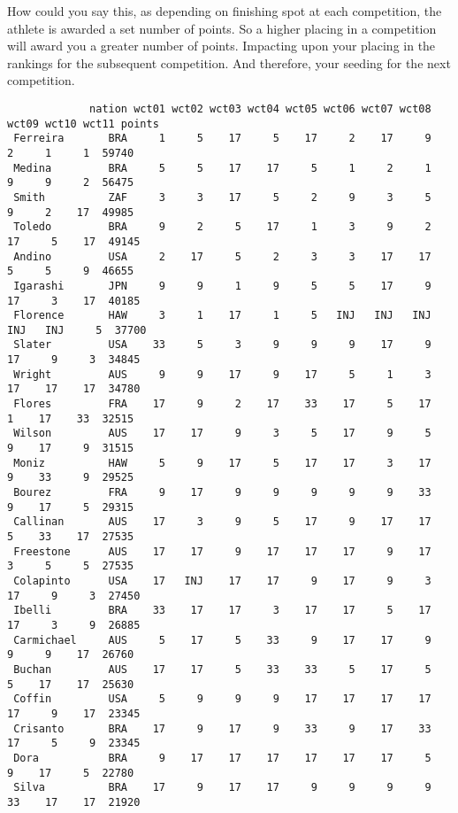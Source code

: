 \documentclass[12pt]{article}
\begin{document}
How could you say this, as depending on finishing spot at each
competition, the athlete is awarded a set number of points. So a
higher placing in a competition will award you a greater number of
points. Impacting upon your placing in the rankings for the subsequent
competition. And therefore, your seeding for the next competition.

{\footnotesize
\begin{verbatim}
             nation wct01 wct02 wct03 wct04 wct05 wct06 wct07 wct08 wct09 wct10 wct11 points
 Ferreira       BRA     1     5    17     5    17     2    17     9     2     1     1  59740
 Medina         BRA     5     5    17    17     5     1     2     1     9     9     2  56475
 Smith          ZAF     3     3    17     5     2     9     3     5     9     2    17  49985
 Toledo         BRA     9     2     5    17     1     3     9     2    17     5    17  49145
 Andino         USA     2    17     5     2     3     3    17    17     5     5     9  46655
 Igarashi       JPN     9     9     1     9     5     5    17     9    17     3    17  40185
 Florence       HAW     3     1    17     1     5   INJ   INJ   INJ   INJ   INJ     5  37700
 Slater         USA    33     5     3     9     9     9    17     9    17     9     3  34845
 Wright         AUS     9     9    17     9    17     5     1     3    17    17    17  34780
 Flores         FRA    17     9     2    17    33    17     5    17     1    17    33  32515
 Wilson         AUS    17    17     9     3     5    17     9     5     9    17     9  31515
 Moniz          HAW     5     9    17     5    17    17     3    17     9    33     9  29525
 Bourez         FRA     9    17     9     9     9     9     9    33     9    17     5  29315
 Callinan       AUS    17     3     9     5    17     9    17    17     5    33    17  27535
 Freestone      AUS    17    17     9    17    17    17     9    17     3     5     5  27535
 Colapinto      USA    17   INJ    17    17     9    17     9     3    17     9     3  27450
 Ibelli         BRA    33    17    17     3    17    17     5    17    17     3     9  26885
 Carmichael     AUS     5    17     5    33     9    17    17     9     9     9    17  26760
 Buchan         AUS    17    17     5    33    33     5    17     5     5    17    17  25630
 Coffin         USA     5     9     9     9    17    17    17    17    17     9    17  23345
 Crisanto       BRA    17     9    17     9    33     9    17    33    17     5     9  23345
 Dora           BRA     9    17    17    17    17    17    17     5     9    17     5  22780
 Silva          BRA    17     9    17    17     9     9     9     9    33    17    17  21920

\end{verbatim}}
\end{document}
